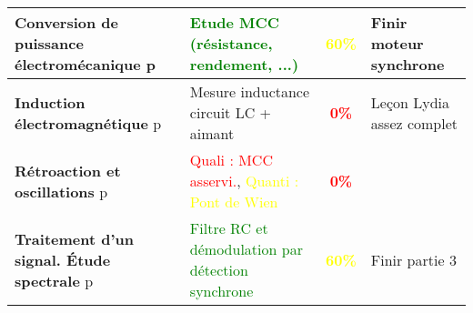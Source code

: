 \begin{changemargin}{-1.5cm}{-0cm}
\begin{center}
\begin{tabularx}{\paperwidth-2cm}{| X | X | c | X |}
  \hline 
  \hline
  \textbf{Conversion de puissance électromécanique} p\pageref{LP_ConversionPuissance} & \textcolor{green}{Etude MCC (résistance, rendement, ...)} & \textcolor{yellow}{\textbf{60\%}} & Finir moteur synchrone\\
  \hline 
  \textbf{Induction électromagnétique} p\pageref{LP_Induction} & Mesure inductance circuit LC + aimant & \textcolor{red}{\textbf{0\%}} & Leçon Lydia assez complet\\
  \hline
  \textbf{Rétroaction et oscillations} p\pageref{LP_RetroactionOscillation} & \textcolor{red}{Quali : MCC asservi.}, \textcolor{yellow}{Quanti : Pont de Wien} & \textcolor{red}{\textbf{0\%}} & \\
  \hline
  \textbf{Traitement d'un signal. Étude spectrale} p\pageref{LP_TraitementSignal} & \textcolor{green}{Filtre RC et démodulation par détection synchrone} & \textcolor{yellow}{\textbf{60\%}} & Finir partie 3\\
  \hline
\end{tabularx}
\end{center}


\end{changemargin}
